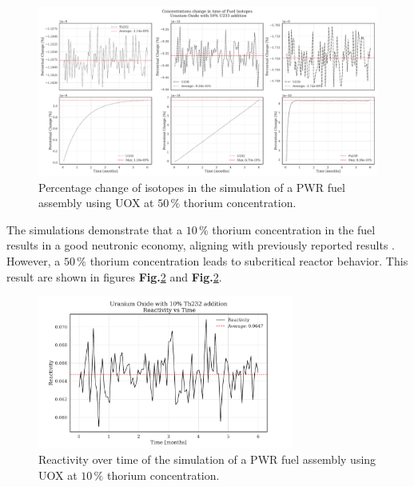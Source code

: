 \begin{figure}[ht]
    \centering
    \includegraphics[width=1\textwidth]{Kap7/Figures_Kap7/percentual_change_th232_con_50.pdf}
    \caption{Percentage change of isotopes in the simulation of a PWR fuel assembly using UOX at \(50 \, \%\) thorium concentration.}
    \label{fig:th50}
\end{figure}

The simulations demonstrate that a \(10 \, \%\) thorium concentration in the fuel results in a good neutronic economy, aligning with previously reported results \cite{N_Improvement}. However, a \(50 \, \%\) thorium concentration leads to subcritical reactor behavior. This result are shown in figures \textbf{Fig.}\ref{fig:p_10} and \textbf{Fig.}\ref{fig:p_10}.

\begin{figure}[ht]
    \centering
    \includegraphics[width=0.75\textwidth, scale = 0.5]{Kap7/Figures_Kap7/Reactivity_vs_Time_UOX_10.pdf}
    \caption{Reactivity over time of the simulation of a PWR fuel assembly using UOX at \(10 \, \%\) thorium concentration.}
    \label{fig:p_10}
\end{figure}

